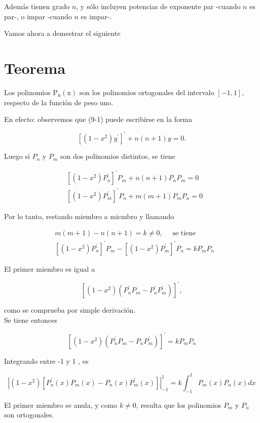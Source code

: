 \documentclass[10pt]{article}
\theoremstyle{plain}
\theoremstyle{definition}
\theoremstyle{remark}
\begin{document}
Además tienen grado $n$, y sólo incluyen potencias de exponente par -cuando $n$ es par-, o impar -cuando $n$ es impar-.

Vamos ahora a demestrar el siguiente

\section*{Teorema}
Los polinomios $\mathrm{P}_{\mathrm{n}}(\mathrm{x})$ son los polinomios ortogonales del intervalo $[-1,1]$, respecto de la función de peso uno.

En efecto: observemos que (9-1) puede escribirse en la forma

$$
\left[\left(1-x^{2}\right) y^{\prime}\right]^{\prime}+n(n+1) y=0 .
$$

Luego si $P_{n}$ y $P_{m}$ son dos polinomios distintos, se tiene

$$
\begin{aligned}
& {\left[\left(1-x^{2}\right) P_{n}^{\prime}\right]^{\prime} P_{m}+n(n+1) P_{n} P_{m}=0} \\
& {\left[\left(1-x^{2}\right) P_{m}^{\prime}\right]^{\prime} P_{n}+m(m+1) P_{m} P_{n}=0}
\end{aligned}
$$

Por lo tanto, restando miembro a micmbro y llamando

$$
\begin{aligned}
& m(m+1)-n(n+1)=k \neq 0, \quad \text { se tiene } \\
& {\left[\left(1-x^{2}\right) P_{n}^{\prime}\right]^{\prime} P_{m}-\left[\left(1-x^{2}\right) P_{m}^{\prime}\right]^{\prime} P_{n}=k P_{m} P_{n}}
\end{aligned}
$$

El primer miembro es igual a

$$
\left[\left(1-x^{2}\right)\left(P_{n}^{\prime} P_{m}-P_{n}^{\prime} P_{m}^{\prime}\right)\right]^{\prime},
$$

como se comprueba por simple derivación.\\
Se tiene entonces

$$
\left[\left(1-x^{2}\right)\left(P_{n}^{\prime} P_{m}-P_{n} P_{m}^{\prime}\right)\right]^{\prime}=k P_{m} P_{n}
$$

Integrando entre -1 y 1 , es

$$
\left|\left(1-x^{2}\right)\left[P_{n}^{\prime}(x) P_{m}(x)-P_{n}(x) P_{m}^{\prime}(x)\right]\right|_{-1}^{1}=k \int_{-1}^{1} P_{m}(x) P_{n}(x) d x
$$

El primer miembro se anula, y como $k \neq 0$, resulta que los polinomios $P_{m}$ y $P_{n}$ son ortogonales.
\end{document}
